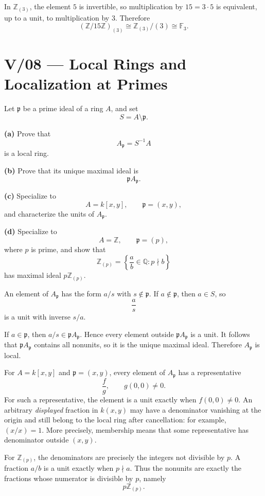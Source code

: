 \begin{solution}
In \(\mathbb Z_{(3)}\), the element \(5\) is invertible, so multiplication by \(15=3\cdot 5\) is equivalent, up to a unit, to multiplication by \(3\). Therefore
\[
(\mathbb Z/15\mathbb Z)_{(3)} \cong \mathbb Z_{(3)}/(3)\cong \mathbb F_3.
\]
\end{solution}



\section*{V/08 --- Local Rings and Localization at Primes}

\begin{problem}[CP-V-0016]
\label{prob:cp-v-0016}
Let \(\mathfrak p\) be a prime ideal of a ring \(A\), and set
\[
S=A\setminus\mathfrak p.
\]

\textbf{(a)} Prove that
\[
A_{\mathfrak p}=S^{-1}A
\]
is a local ring.

\textbf{(b)} Prove that its unique maximal ideal is
\[
\mathfrak pA_{\mathfrak p}.
\]

\textbf{(c)} Specialize to
\[
A=k[x,y],\qquad \mathfrak p=(x,y),
\]
and characterize the units of \(A_{\mathfrak p}\).

\textbf{(d)} Specialize to
\[
A=\mathbb Z,\qquad \mathfrak p=(p),
\]
where \(p\) is prime, and show that
\[
\mathbb Z_{(p)}
=
\left\{\frac ab\in\mathbb Q:p\nmid b\right\}
\]
has maximal ideal \(p\mathbb Z_{(p)}\).
\end{problem}

\begin{solution}
An element of \(A_{\mathfrak p}\) has the form \(a/s\) with
\(s\notin\mathfrak p\). If \(a\notin\mathfrak p\), then \(a\in S\), so
\[
\frac{a}{s}
\]
is a unit with inverse \(s/a\).

If \(a\in\mathfrak p\), then \(a/s\in\mathfrak pA_{\mathfrak p}\). Hence every
element outside \(\mathfrak pA_{\mathfrak p}\) is a unit. It follows that
\(\mathfrak pA_{\mathfrak p}\) contains all nonunits, so it is the unique
maximal ideal. Therefore \(A_{\mathfrak p}\) is local.

For \(A=k[x,y]\) and \(\mathfrak p=(x,y)\), every element of
\(A_{\mathfrak p}\) has a representative
\[
\frac{f}{g},\qquad g(0,0)\ne0.
\]
For such a representative, the element is a unit exactly when
\(f(0,0)\ne0\). An arbitrary \emph{displayed} fraction in
\(k(x,y)\) may have a denominator vanishing at the origin and still
belong to the local ring after cancellation: for example,
\((x/x)=1\). More precisely, membership means that some
representative has denominator outside \((x,y)\).

For \(\mathbb Z_{(p)}\), the denominators are precisely the integers not
divisible by \(p\). A fraction \(a/b\) is a unit exactly when \(p\nmid a\).
Thus the nonunits are exactly the fractions whose numerator is divisible by
\(p\), namely
\[
p\mathbb Z_{(p)}.
\]
\end{solution}



